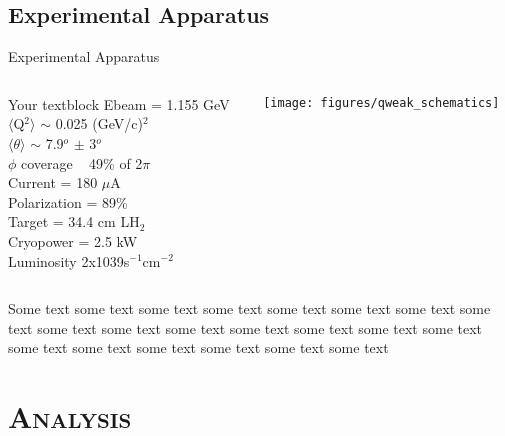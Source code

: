 \documentclass[xcolor=x11names,compress,8pt]{beamer}
\renewcommand{\(}{\begin{columns}}
\renewcommand{\)}{\end{columns}}
\newcommand{\<}[1]{\begin{column}{#1}}
\renewcommand{\>}{\end{column}}
\begin{document}
\subsection{Experimental Apparatus}
\begin{frame}{Experimental Apparatus}

  \begin{columns}[T]
    \begin{column}{0.25\textwidth}
     \begin{block}{Your textblock}
	\pause
	\fontsize{6pt}{7.2}\selectfont
	Ebeam = 1.155 GeV\\
	$\langle$Q$^{2}\rangle$ $\sim$ 0.025 (GeV/c)$^{2}$\\
	$\langle\theta\rangle$ $\sim$ 7.9$^{o}$ $\pm$ 3$^{o}$\\
	$\phi$ coverage ~ 49\% of 2$\pi$\\
	Current = 180 $\mu$A\\
	Polarization = 89\%\\
	Target = 34.4 cm LH$_{2}$\\
	Cryopower = 2.5 kW\\
	Luminosity 2x1039s$^{-1}$cm$^{-2}$\\


    \end{block}
    \end{column}
    \begin{column}{0.80\textwidth}
    \begin{block}{}
	\texttt{[image: figures/qweak\_schematics]}
    \end{block}
    \end{column}
  \end{columns}

	\pause
Some text some text some text some text some text some text some text some text some text some text some text some text some text some text some text some text some text some text some text some text some text

\end{frame}




\section{\scshape Analysis}
\end{document}
